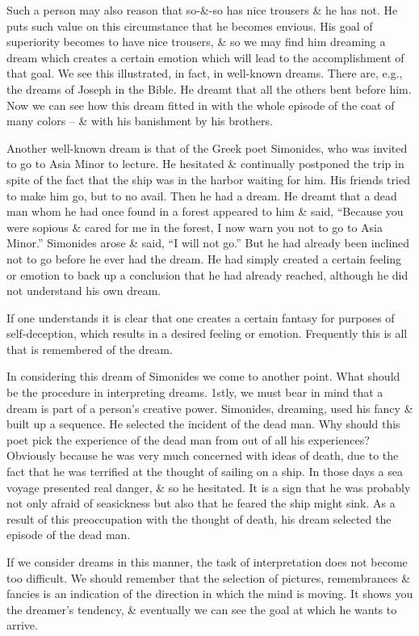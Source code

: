 \documentclass{article}
\numberwithin{equation}{section}
\begin{document}
Such a person may also reason that so-\&-so has nice trousers \& he has not. He puts such value on this circumstance that he becomes envious. His goal of superiority becomes to have nice trousers, \& so we may find him dreaming a dream which creates a certain emotion which will lead to the accomplishment of that goal. We see this illustrated, in fact, in well-known dreams. There are, e.g., the dreams of Joseph in the Bible. He dreamt that all the others bent before him. Now we can see how this dream fitted in with the whole episode of the coat of many colors -- \& with his banishment by his brothers.

Another well-known dream is that of the Greek poet Simonides, who was invited to go to Asia Minor to lecture. He hesitated \& continually postponed the trip in spite of the fact that the ship was in the harbor waiting for him. His friends tried to make him go, but to no avail. Then he had a dream. He dreamt that a dead man whom he had once found in a forest appeared to him \& said, ``Because you were sopious \& cared for me in the forest, I now warn you not to go to Asia Minor.'' Simonides arose \& said, ``I will not go.'' But he had already been inclined not to go before he ever had the dream. He had simply created a certain feeling or emotion to back up a conclusion that he had already reached, although he did not understand his own dream.

If one understands it is clear that one creates a certain fantasy for purposes of self-deception, which results in a desired feeling or emotion. Frequently this is all that is remembered of the dream.

In considering this dream of Simonides we come to another point. What should be the procedure in interpreting dreams. 1stly, we must bear in mind that a dream is part of a person's creative power. Simonides, dreaming, used his fancy \& built up a sequence. He selected the incident of the dead man. Why should this poet pick the experience of the dead man from out of all his experiences? Obviously because he was very much concerned with ideas of death, due to the fact that he was terrified at the thought of sailing on a ship. In those days a sea voyage presented real danger, \& so he hesitated. It is a sign that he was probably not only afraid of seasickness but also that he feared the ship might sink. As a result of this preoccupation with the thought of death, his dream selected the episode of the dead man.

If we consider dreams in this manner, the task of interpretation does not become too difficult. We should remember that the selection of pictures, remembrances \& fancies is an indication of the direction in which the mind is moving. It shows you the dreamer's tendency, \& eventually we can see the goal at which he wants to arrive.
\end{document}
